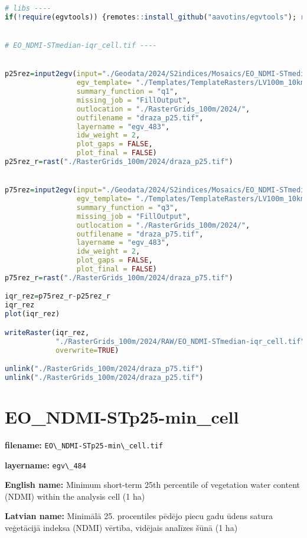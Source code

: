 \documentclass[
]{book}
\newcommand{\passthrough}[1]{#1}
\begin{document}
\begin{lstlisting}[language=R]
# libs ----
if(!require(egvtools)) {remotes::install_github("aavotins/egvtools"); require(egvtools)}


# EO_NDMI-STmedian-iqr_cell.tif ----


p25rez=input2egv(input="./Geodata/2024/S2indices/Mosaics/EO_NDMI-STmedian.tif",
                 egv_template= "./Templates/TemplateRasters/LV100m_10km.tif",
                 summary_function = "q1",
                 missing_job = "FillOutput",
                 outlocation = "./RasterGrids_100m/2024/",
                 outfilename = "draza_p25.tif",
                 layername = "egv_483",
                 idw_weight = 2,
                 plot_gaps = FALSE,
                 plot_final = FALSE)
p25rez_r=rast("./RasterGrids_100m/2024/draza_p25.tif")


p75rez=input2egv(input="./Geodata/2024/S2indices/Mosaics/EO_NDMI-STmedian.tif",
                 egv_template= "./Templates/TemplateRasters/LV100m_10km.tif",
                 summary_function = "q3",
                 missing_job = "FillOutput",
                 outlocation = "./RasterGrids_100m/2024/",
                 outfilename = "draza_p75.tif",
                 layername = "egv_483",
                 idw_weight = 2,
                 plot_gaps = FALSE,
                 plot_final = FALSE)
p75rez_r=rast("./RasterGrids_100m/2024/draza_p75.tif")

iqr_rez=p75rez_r-p25rez_r
iqr_rez
plot(iqr_rez)

writeRaster(iqr_rez,
            "./RasterGrids_100m/2024/RAW/EO_NDMI-STmedian-iqr_cell.tif",
            overwrite=TRUE)

unlink("./RasterGrids_100m/2024/draza_p75.tif")
unlink("./RasterGrids_100m/2024/draza_p25.tif")
\end{lstlisting}

\section{EO\_NDMI-STp25-min\_cell}\label{ch06.484}

\textbf{filename:} \passthrough{\lstinline!EO\_NDMI-STp25-min\_cell.tif!}

\textbf{layername:} \passthrough{\lstinline!egv\_484!}

\textbf{English name:} Minimum short-term 25th percentile of vegetation water content (NDMI) within the analysis cell (1 ha)

\textbf{Latvian name:} Minimālā 25. procentiles pēdējo piecu gadu ūdens satura veģetācijā indeksa (NDMI) vērtība, vidējais analīzes šūnā (1 ha)
\end{document}
